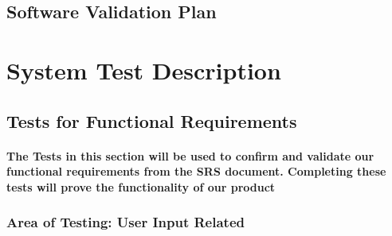 \documentclass[12pt, titlepage]{article}
\begin{document}

\subsection{Software Validation Plan}


\section{System Test Description}
	
\subsection{Tests for Functional Requirements}

\paragraph{The Tests in this section will be used to confirm and validate our functional requirements from the SRS document. Completing these tests will prove the functionality of our product}

\subsubsection{Area of Testing: User Input Related}
\end{document}

